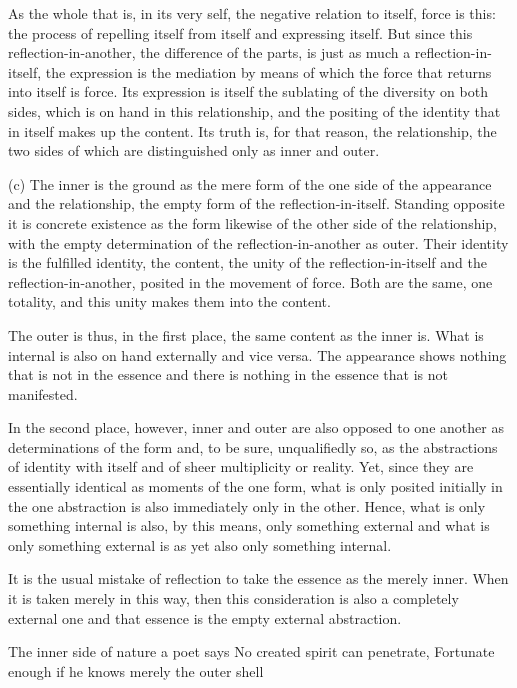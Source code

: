 As the whole that is, in its very self,
the negative relation to itself, force is this:
the process of repelling itself from itself
and expressing itself.
But since this reflection-in-another,
the difference of the parts,
is just as much a reflection-in-itself,
the expression is the mediation by means of which
the force that returns into itself is force.
Its expression is itself the sublating of
the diversity on both sides,
which is on hand in this relationship,
and the positing of the identity
that in itself makes up the content.
Its truth is, for that reason, the relationship,
the two sides of which are distinguished only as inner and outer.

(c) The inner is the ground as the mere form
of the one side of the appearance and the relationship,
the empty form of the reflection-in-itself.
Standing opposite it is concrete existence as the form likewise
of the other side of the relationship,
with the empty determination of the
reflection-in-another as outer.
Their identity is the fulfilled identity, the content,
the unity of the reflection-in-itself and
the reflection-in-another,
posited in the movement of force.
Both are the same, one totality,
and this unity makes them into the content.

The outer is thus, in the first place, the same content as the inner is.
What is internal is also on hand externally and vice versa.
The appearance shows nothing that is not in the essence and
there is nothing in the essence that is not manifested.

In the second place, however,
inner and outer are also opposed to one another
as determinations of the form
and, to be sure, unqualifiedly so,
as the abstractions of identity with itself
and of sheer multiplicity or reality.
Yet, since they are essentially identical
as moments of the one form,
what is only posited initially
in the one abstraction is
also immediately only in the other.
Hence, what is only something internal is
also, by this means, only something external
and what is only something external is
as yet also only something internal.

It is the usual mistake of reflection
to take the essence as the merely inner.
When it is taken merely in this way,
then this consideration is
also a completely external one
and that essence is the empty external abstraction.

    The inner side of nature a poet says
    No created spirit can penetrate,
    Fortunate enough if he knows merely the outer shell

